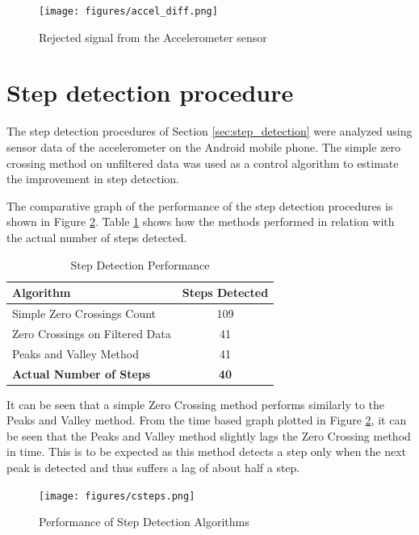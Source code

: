 \begin{figure}[tbph]
    \centering
    \texttt{[image: figures/accel\_diff.png]}
    \caption{Rejected signal from the Accelerometer sensor \label{fig:accel_diff}}
\end{figure}


\section{Step detection procedure}

The step detection procedures of Section \ref{sec:step_detection} were analyzed
using sensor data of the accelerometer on the Android mobile phone. 
The simple zero crossing method on unfiltered data was used as a control 
algorithm to estimate the improvement in step detection.

The comparative graph of the performance of the step detection procedures 
is shown in Figure \ref{fig:csteps}. Table \ref{tbl:step_table} shows how the 
methods performed in relation with the actual number of steps detected.


\begin{table}[tbph]
\centering
\begin{tabular}{||l|c||}
\hline
\hline
\textbf{Algorithm} & \textbf{Steps Detected} \\
\hline
Simple Zero Crossings Count & 109 \\
Zero Crossings on Filtered Data & 41 \\
Peaks and Valley Method & 41 \\
\textbf{Actual Number of Steps} & \textbf{40} \\
\hline
\hline
\end{tabular}
\caption{Step Detection Performance\label{tbl:step_table}}
\end{table}

It can be seen that a simple Zero Crossing method performs similarly to the 
Peaks and Valley method. From the time based graph plotted in 
Figure \ref{fig:csteps}, it can be seen that the Peaks and Valley method 
slightly lags the Zero Crossing method in time. This is to be expected as this
method detects a step only when the next peak is detected and thus suffers a 
lag of about half a step.

\begin{figure}[tbph]
    \centering
    \texttt{[image: figures/csteps.png]}
    \caption{Performance of Step Detection Algorithms\label{fig:csteps}}
\end{figure}


